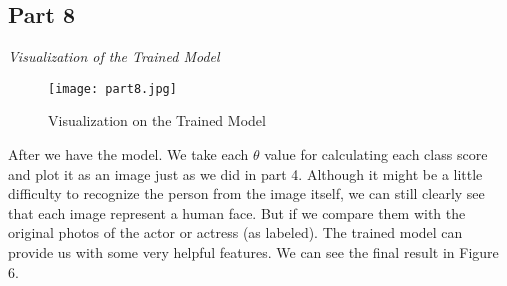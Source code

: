 \documentclass{article}
\begin{document}
\newpage
\begin{part8}

\maketitle

\newpage
\section{Part 8}
\noindent \textit{Visualization of the Trained Model}

\begin{figure*}[h!]
    \centering
    \texttt{[image: part8.jpg]}
    \caption{Visualization on the Trained Model}
    \label{fig:mean_a}
\end{figure*}

After we have the model. We take each $\theta$ value for calculating each class score and plot it as an image just as we did in part 4. Although it might be a little difficulty to recognize the person from the image itself, we can still clearly see that each image represent a human face. But if we compare them with the original photos of the actor or actress (as labeled). The trained model can provide us with some very helpful features. We can see the final result in Figure 6.

\end{part8}
\end{document}

